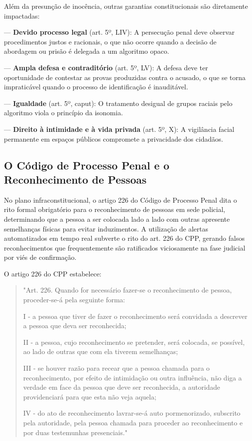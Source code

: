 \documentclass[12pt,a4paper]{article}
\begin{document}
Além da presunção de inocência, outras garantias constitucionais são diretamente impactadas:

--- \textbf{Devido processo legal} (art. 5º, LIV): A persecução penal deve observar procedimentos justos e racionais, o que não ocorre quando a decisão de abordagem ou prisão é delegada a um algoritmo opaco.

--- \textbf{Ampla defesa e contraditório} (art. 5º, LV): A defesa deve ter oportunidade de contestar as provas produzidas contra o acusado, o que se torna impraticável quando o processo de identificação é inauditável.

--- \textbf{Igualdade} (art. 5º, caput): O tratamento desigual de grupos raciais pelo algoritmo viola o princípio da isonomia.

--- \textbf{Direito à intimidade e à vida privada} (art. 5º, X): A vigilância facial permanente em espaços públicos compromete a privacidade dos cidadãos.

\subsection{O Código de Processo Penal e o Reconhecimento de Pessoas}

No plano infraconstitucional, o artigo 226 do Código de Processo Penal dita o rito formal obrigatório para o reconhecimento de pessoas em sede policial, determinando que a pessoa a ser colocada lado a lado com outras apresente semelhanças físicas para evitar induzimentos. A utilização de alertas automatizados em tempo real subverte o rito do art. 226 do CPP, gerando falsos reconhecimentos que frequentemente são ratificados viciosamente na fase judicial por viés de confirmação.

O artigo 226 do CPP estabelece:

\begin{quote}
"Art. 226. Quando for necessário fazer-se o reconhecimento de pessoa, proceder-se-á pela seguinte forma:

I - a pessoa que tiver de fazer o reconhecimento será convidada a descrever a pessoa que deva ser reconhecida;

II - a pessoa, cujo reconhecimento se pretender, será colocada, se possível, ao lado de outras que com ela tiverem semelhanças;

III - se houver razão para recear que a pessoa chamada para o reconhecimento, por efeito de intimidação ou outra influência, não diga a verdade em face da pessoa que deve ser reconhecida, a autoridade providenciará para que esta não veja aquela;

IV - do ato de reconhecimento lavrar-se-á auto pormenorizado, subscrito pela autoridade, pela pessoa chamada para proceder ao reconhecimento e por duas testemunhas presenciais."
\end{quote}
\end{document}
